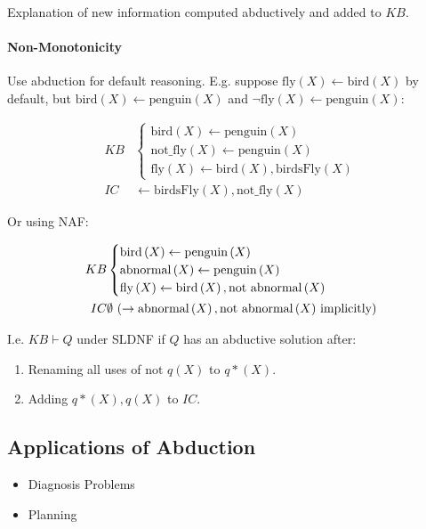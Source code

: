 \documentclass[twocolumn,english]{article}
\begin{document}
Explanation of new information computed abductively and added to $KB$.

\paragraph{Non-Monotonicity}

Use abduction for default reasoning. E.g. suppose $\text{fly}\left(X\right)\leftarrow\text{bird}\left(X\right)$
by default, but $\text{bird}\left(X\right)\leftarrow\text{penguin}\left(X\right)$
and $\lnot\text{fly}\left(X\right)\leftarrow\text{penguin}\left(X\right)$:

\begin{align*}
KB & \begin{cases}
\text{bird}\left(X\right)\leftarrow\text{penguin}\left(X\right)\\
\text{not\_fly}\left(X\right)\leftarrow\text{penguin}\left(X\right)\\
\text{fly}\left(X\right)\leftarrow\text{bird}\left(X\right),\text{birdsFly}\left(X\right)
\end{cases}\\
IC & \leftarrow\text{birdsFly}\left(X\right),\text{not\_fly}\left(X\right)
\end{align*}

Or using NAF:

\begin{align*}
KB & \begin{cases}
\text{bird}\left(X\right)\leftarrow\text{penguin}\left(X\right)\\
\text{abnormal}\left(X\right)\leftarrow\text{penguin}\left(X\right)\\
\text{fly}\left(X\right)\leftarrow\text{bird}\left(X\right),\text{not abnormal}\left(X\right)
\end{cases}\\
IC & \emptyset\text{ (\ensuremath{\rightarrow\text{abnormal}\left(X\right),\text{not abnormal}\left(X\right)} implicitly)}
\end{align*}

I.e. $KB\vdash Q$ under SLDNF if $Q$ has an abductive solution after:
\begin{enumerate}
\item Renaming all uses of $\text{not }q\left(X\right)$ to $q*\left(X\right)$.
\item Adding $q*\left(X\right),q\left(X\right)$ to $IC$.
\end{enumerate}

\subsection{Applications of Abduction}
\begin{itemize}
\item Diagnosis Problems
\item Planning
\end{itemize}
\end{document}
